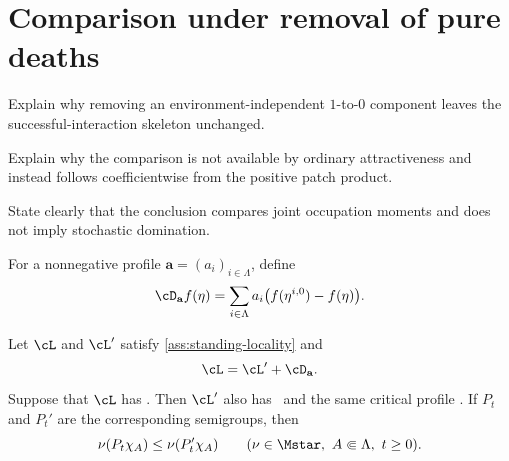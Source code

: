 \section{Comparison under removal of pure deaths}
\label{sec:pure-death-comparison}

\begin{discussion}
  \item Explain why removing an environment-independent
  \(1\)-to-\(0\) component leaves the successful-interaction skeleton
  unchanged.
  \item Explain why the comparison is not available by ordinary
  attractiveness and instead follows coefficientwise from the positive
  patch product.
  \item State clearly that the conclusion compares joint occupation
  moments and does not imply stochastic domination.
\end{discussion}

\begin{definition}
\label{def:pure-death-generator}
For a nonnegative profile \(\mathbf a=(a_i)_{i\in\Lambda}\), define
\[
  \cD_{\mathbf a}f(\eta)
  =
  \sum_{i\in\Lambda}
  a_i\bigl(f(\eta^{i,0})-f(\eta)\bigr).
\]
\end{definition}

\begin{theorem}
\label{thm:pure-death-comparison}
Let \(\cL\) and \(\cL'\) satisfy
\cref{ass:standing-locality} and
\[
  \cL=\cL'+\cD_{\mathbf a}.
\]
Suppose that \(\cL\) has \patchpositivity. Then \(\cL'\) also has
\patchpositivity\ and the same critical profile \pstar. If \(P_t\) and
\(P_t'\) are the corresponding semigroups, then
\begin{equation}
  \nu(P_t\chi_A)
  \le
  \nu(P_t'\chi_A)
  \qquad
  (\nu\in\Mstar,\ A\Subset\Lambda,\ t\ge0).
  \label{eq:pure-death-comparison}
\end{equation}
\end{theorem}

